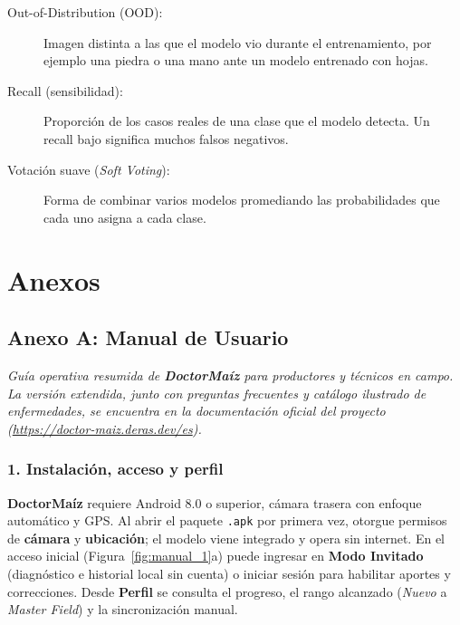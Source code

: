 \begin{singlespace}
\begin{description}
\item[Out-of-Distribution (OOD):] Imagen distinta a las que el modelo vio durante el entrenamiento, por ejemplo una piedra o una mano ante un modelo entrenado con hojas.
\item[Recall (sensibilidad):] Proporci\'on de los casos reales de una clase que el modelo detecta. Un recall bajo significa muchos falsos negativos.
\item[Votaci\'on suave (\textit{Soft Voting}):] Forma de combinar varios modelos promediando las probabilidades que cada uno asigna a cada clase.
\end{description}
\end{singlespace}

\newpage
\chapter*{Anexos}

\section*{Anexo A: Manual de Usuario}

\begin{singlespace}
{\small\noindent\textit{Gu\'ia operativa resumida de \textbf{DoctorMa\'iz} para productores y t\'ecnicos en campo. La versi\'on extendida, junto con preguntas frecuentes y cat\'alogo ilustrado de enfermedades, se encuentra en la documentaci\'on oficial del proyecto (\url{https://doctor-maiz.deras.dev/es}).}}
\end{singlespace}

\subsection*{1. Instalaci\'on, acceso y perfil}
\textbf{DoctorMa\'iz} requiere Android 8.0 o superior, c\'amara trasera con enfoque autom\'atico y GPS. Al abrir el paquete \texttt{.apk} por primera vez, otorgue permisos de \textbf{c\'amara} y \textbf{ubicaci\'on}; el modelo viene integrado y opera sin internet. En el acceso inicial (Figura~\ref{fig:manual_1}a) puede ingresar en \textbf{Modo Invitado} (diagn\'ostico e historial local sin cuenta) o iniciar sesi\'on para habilitar aportes y correcciones. Desde \textbf{Perfil} se consulta el progreso, el rango alcanzado (\textit{Nuevo} a \textit{Master Field}) y la sincronizaci\'on manual.

